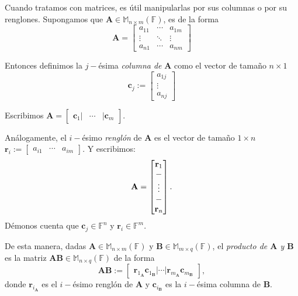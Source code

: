             Cuando tratamos con matrices, es útil manipularlas por sus columnas o por su renglones. Supongamos que $\mathbf{A} \in \mathbb{M}_{n \times m}(\mathbb{F})$, es de la forma
            $$
            \mathbf{A}= \begin{bmatrix}
            a_{11} & \cdots & a_{1m}\\ 
            \vdots & \ddots &\vdots\\ 
            a_{n1} &\cdots  & a_{nm} 
            \end{bmatrix}
            $$

            Entonces definimos la $j-$ésima \textit{columna de}  $\mathbf{A}$ como el vector de tamaño $n \times 1$ $$\mathbf{c}_{j} := \begin{bmatrix}
            a_{1j} \\ 
            \vdots\\
            a_{nj}
            \end{bmatrix}
            $$
            
             Escribimos $\mathbf{A} = \begin{bmatrix}
            \mathbf{c}_{1} | & \cdots & |\mathbf{c}_{m}
            \end{bmatrix}.$
            
            Análogamente, el $i-$ésimo \textit{renglón} de $\mathbf{A}$ es el vector de tamaño $1 \times n$ $\mathbf{r}_{i}:= \begin{bmatrix}
            a_{i1} & \cdots & a_{im}
            \end{bmatrix}.$ Y escribimos: $$\mathbf{A} = \begin{bmatrix}
            \mathbf{r}_{1}\\
            \--\\
            \vdots \\
            \--\\
            \mathbf{r}_{n}
            \end{bmatrix}.$$ Démonos cuenta que $\mathbf{c}_{j} \in \mathbb{F}^{n}$ y $\mathbf{r}_{i} \in \mathbb{F}^{m}$.
            
            De esta manera, dadas $\mathbf{A} \in \mathbb{M}_{n \times m}(\mathbb{F})$ y $\mathbf{B} \in \mathbb{M}_{m \times q}(\mathbb{F})$, el \textit{producto de $\mathbf{A}$ y $\mathbf{B}$} es la matriz $\mathbf{AB} \in \mathbb{M}_{n \times q}(\mathbb{F})$ de la forma $$ \mathbf{AB}:= \begin{bmatrix}
            \mathbf{r}_{1_{\mathbf{A}}}\mathbf{c}_{1_\mathbf{B}} | \cdots | \mathbf{r}_{m_{\mathbf{A}}}\mathbf{c}_{m_{\mathbf{B}}}
            \end{bmatrix}, $$ donde $\mathbf{r}_{i_\mathbf{A}}$ es el $i-$ésimo renglón de $\mathbf{A}$ y $\mathbf{c}_{i_\mathbf{B}}$ es la $i-$ésima columna de $\mathbf{B}$.
            
